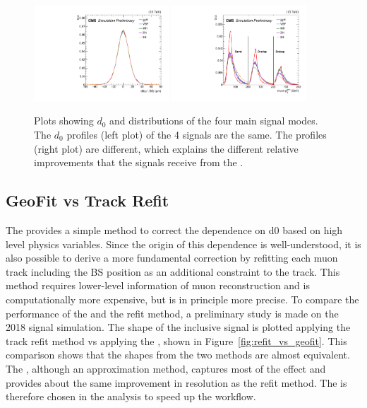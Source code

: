 \begin{figure}[!htb]
      \centering
      \includegraphics[width=0.45\textwidth]{pics/muon_corr/GeoFit/performance/samp_d0.pdf}
      \includegraphics[width=0.45\textwidth]{pics/muon_corr/GeoFit/performance/samp_pt_BOE.pdf}
      \caption{Plots showing $d_0$ and \pt distributions of the four main \hmm signal modes. 
               The $d_0$ profiles (left plot) of the 4 signals are the same.
               The \pt profiles (right plot) are different, which explains the different relative improvements  
               that the signals receive from the \GeoFit.
               }
      \label{fig:sigs_d0_pt}
\end{figure}



\subsection{GeoFit vs Track Refit}\label{sec:track_refit}

The \GeoFit provides a simple method to correct the \pt dependence on d0 based on high level physics variables.
Since the origin of this \pt dependence is well-understood, it is also possible to derive a more fundamental correction
by refitting each muon track including the BS position as an additional constraint to the track.
This method requires lower-level information of muon reconstruction and is computationally more expensive,
but is in principle more precise.
To compare the performance of the \GeoFit and the refit method, a preliminary study is made on the 2018 \ggH signal simulation.
The \mmm shape of the inclusive signal is plotted applying the track refit method vs applying the \GeoFit, shown in Figure~\ref{fig:refit_vs_geofit}.
This comparison shows that the \mmm shapes from the two methods are almost equivalent.
The \GeoFit, although an approximation method, captures most of the effect and provides about the same improvement in \mmm resolution as the refit method.
The \GeoFit is therefore chosen in the \hmm analysis to speed up the workflow.

